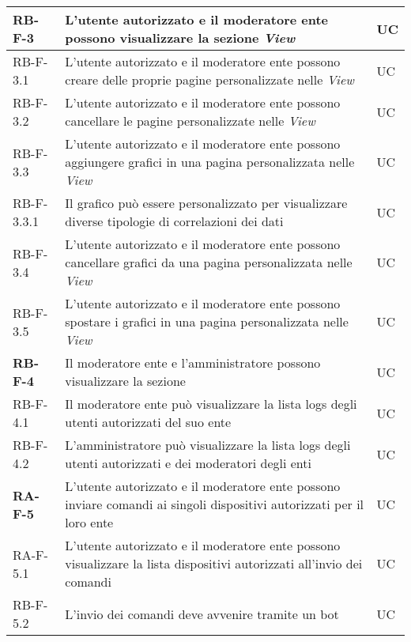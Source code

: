 \begin{center}
\begin{longtable}{|p{3cm}|p{9.85cm}|p{2cm}|}
		\textbf{RB-F-3} & L'utente autorizzato e il moderatore ente possono visualizzare la sezione \textit{View} & UC \\ \hline
		{\color{gray} RB-F-}3.1 & L'utente autorizzato e il moderatore ente possono creare delle proprie pagine personalizzate nelle \textit{View} & UC \\ \hline
		{\color{gray} RB-F-}3.2 & L'utente autorizzato e il moderatore ente possono cancellare le pagine personalizzate nelle \textit{View} & UC \\ \hline
		{\color{gray} RB-F-}3.3 & L'utente autorizzato e il moderatore ente possono aggiungere grafici in una pagina personalizzata nelle \textit{View} & UC \\ \hline
		{\color{gray} RB-F-}3.3.1 & Il grafico può essere personalizzato per visualizzare diverse tipologie di correlazioni dei dati & UC \\ \hline
		{\color{gray} RB-F-}3.4 & L'utente autorizzato e il moderatore ente possono cancellare grafici da una pagina personalizzata nelle \textit{View} & UC \\ \hline
		{\color{gray} RB-F-}3.5 & L'utente autorizzato e il moderatore ente possono spostare i grafici in una pagina personalizzata nelle \textit{View} & UC \\ \hline

		\textbf{RB-F-4} & Il moderatore ente e l'amministratore possono visualizzare la sezione \glock{Logs} & UC \\ \hline
		{\color{gray} RB-F-}4.1 & Il moderatore ente può visualizzare la lista logs degli utenti autorizzati del suo ente & UC \\ \hline
		{\color{gray} RB-F-}4.2 & L'amministratore può visualizzare la lista logs degli utenti autorizzati e dei moderatori degli enti & UC \\ \hline

		\textbf{RA-F-5} & L'utente autorizzato e il moderatore ente possono inviare comandi ai singoli dispositivi autorizzati per il loro ente & UC \\ \hline
		{\color{gray} RA-F-}5.1 & L'utente autorizzato e il moderatore ente possono visualizzare la lista dispositivi autorizzati all'invio dei comandi & UC \\ \hline
		{\color{gray} RB-F-}5.2 & L'invio dei comandi deve avvenire tramite un bot \glock{Telegram} & UC \\ \hline


\end{longtable}
\end{center}
